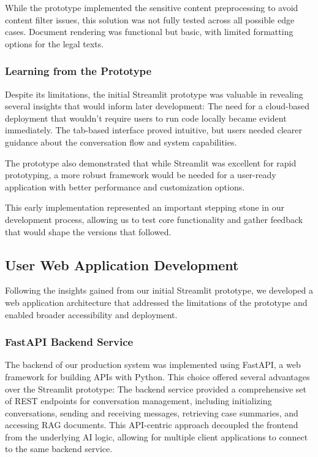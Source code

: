 While the prototype implemented the sensitive content preprocessing to avoid content filter issues, 
this solution was not fully tested across all possible edge cases. Document rendering was functional but basic, 
with limited formatting options for the legal texts.

\subsubsection{Learning from the Prototype}

Despite its limitations, the initial Streamlit prototype was valuable in revealing several insights that would inform later development:
The need for a cloud-based deployment that wouldn't require users to run code locally became evident immediately. The tab-based interface 
proved intuitive, but users needed clearer guidance about the conversation flow and system capabilities.

The prototype also demonstrated that while Streamlit was excellent for rapid prototyping, a more robust framework would be needed for a user-ready 
application with better performance and customization options.

This early implementation represented an important stepping stone in our development process, allowing us to test core functionality and gather 
feedback that would shape the versions that followed.

\subsection{User Web Application Development}
\label{subsec:web-application}

Following the insights gained from our initial Streamlit prototype, we developed a web application architecture that addressed the limitations of the prototype and enabled broader accessibility and deployment.


\subsubsection{FastAPI Backend Service}

The backend of our production system was implemented using FastAPI, a web framework for building APIs with Python. 
This choice offered several advantages over the Streamlit prototype:
The backend service provided a comprehensive set of REST endpoints for conversation management, including initializing conversations, sending and receiving messages, 
retrieving case summaries, and accessing RAG documents. This API-centric approach decoupled the frontend from the underlying AI logic, allowing for multiple client 
applications to connect to the same backend service.

